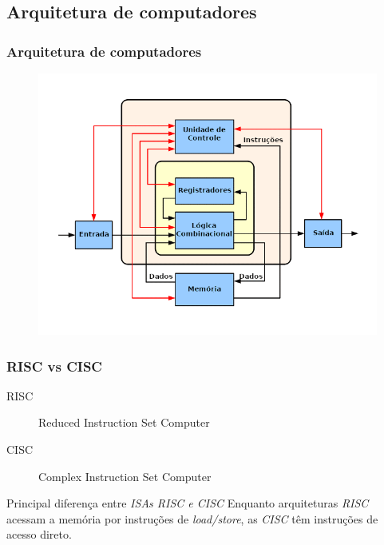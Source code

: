 \documentclass[aspectratio=169]{beamer}
\begin{document}
    \subsection{Arquitetura de computadores}
    \begin{frame}
        \frametitle{Arquitetura de computadores}
        \vfill
        \begin{figure}[H]
        \centering
            \includegraphics[width=.9\textwidth,height=.9\textheight,keepaspectratio]{../images/ABasicComputer.png}
        \end{figure}
        \vfill
    \end{frame}

    \begin{frame}
        \frametitle{RISC vs CISC}
        \vfill
        \begin{description}
            \item[RISC] Reduced Instruction Set Computer
            \item[CISC] Complex Instruction Set Computer
        \end{description}
        \vfill
        \begin{block}{Principal diferença entre \textit{ISAs RISC e CISC}}
        {Enquanto arquiteturas \textit{RISC} acessam a memória por instruções de
            \textit{load/store}, as \textit{CISC} têm instruções de acesso direto.
        }
        \end{block}
        \vfill
    \end{frame}
\end{document}
